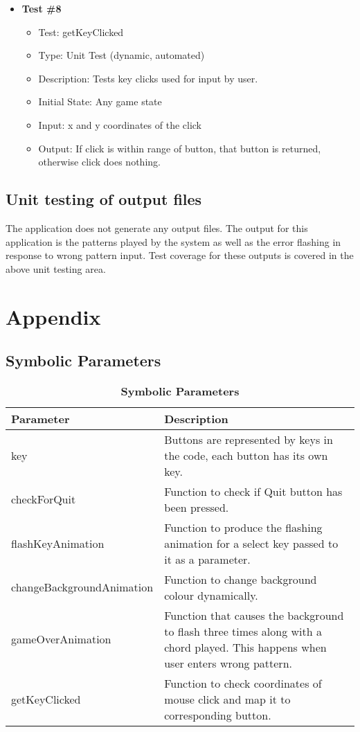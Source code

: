 \documentclass[12pt, titlepage]{article}
\begin{document}
\begin{itemize}
\item \textbf{Test \#8}
\begin{itemize}
\item Test: getKeyClicked
\item Type: Unit Test (dynamic, automated)				
\item Description: Tests key clicks used for input by user.	
\item Initial State: Any game state 	
\item Input: x and y coordinates of the click
\item Output: If click is within range of button, that button is returned, otherwise click does nothing.		
\end{itemize}

\end{itemize}

		
\subsection{Unit testing of output files}	
The application does not generate any output files. The output for this application is the patterns played by the system as well as the error flashing in response to wrong pattern input. Test coverage for these outputs is covered in the above unit testing area.


\newpage
\section{Appendix}
\subsection{Symbolic Parameters}
\begin{table}[h]
\caption{\bf Symbolic Parameters}
\begin{tabularx}{\textwidth}{p{6cm}X}
\toprule {\bf Parameter} & {\bf Description}\\
\midrule
key & Buttons are represented by keys in the code, each button has its own key.\\
checkForQuit & Function to check if Quit button has been pressed.\\
flashKeyAnimation & Function to produce the flashing animation for a select key passed to it as a parameter.\\
changeBackgroundAnimation & Function to change background colour dynamically.\\
gameOverAnimation & Function that causes the background to flash three times along with a chord played. This happens when user enters wrong pattern.\\
getKeyClicked & Function to check coordinates of mouse click and map it to corresponding button.\\
\bottomrule
\end{tabularx}
\end{table}
\end{document}

